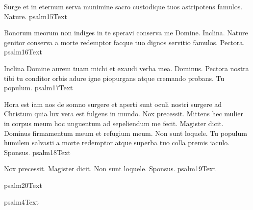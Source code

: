 \documentclass[11pt,openany]{book}
\newcommand{\fullpsalm}[1]{%
	\begingroup %
		\setlength{\parindent}{1em} %
		\renewcommand{\\}{\par\hspace*{1em}} %
		\csname psalm#1Text\endcsname %
	\endgroup %
}
\begin{document}
\begin{multicols*}{2}
 Surge et in eternum serva munimine sacro custodique tuos astripotens famulos.
 Nature.
\fullpsalm{15}
 Bonorum meorum non indiges in te speravi conserva me Domine.
 Inclina.
 Nature genitor conserva a morte redemptor facque tuo dignos servitio famulos.
 Pectora.
\fullpsalm{16}
 Inclina Domine aurem tuam michi et exaudi verba mea.
 Dominus.
 Pectora nostra tibi tu conditor orbis adure igne piopurgans atque cremando probans.
 Tu populum.
\fullpsalm{17}
 Hora est iam nos de somno surgere et aperti sunt oculi nostri surgere ad Christum quia lux vera est fulgens in mundo.
 Nox precessit.
 Mittens hec mulier in corpus meum hoc unguentum ad sepeliendum me fecit.
 Magister dicit.
 Dominus firmamentum meum et refugium meum.
 Non sunt loquele.
 Tu populum humilem salvasti a morte redemptor atque superba tuo colla premis iaculo.
 Sponsus.
\fullpsalm{18}
 Nox precessit.
 Magister dicit.
 Non sunt loquele.
 Sponsus.
\fullpsalm{19}
\fullpsalm{20}


\fullpsalm{4}









\end{multicols*}
\end{document}
